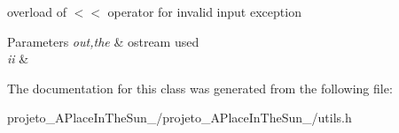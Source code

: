 overload of $<$$<$ operator for invalid input exception 


\begin{DoxyParams}{Parameters}
{\em out,the} & ostream used\\
\hline
{\em ii} & \\
\hline
\end{DoxyParams}


The documentation for this class was generated from the following file\+:\begin{DoxyCompactItemize}
\item 
projeto\+\_\+\+A\+Place\+In\+The\+Sun\+\_/projeto\+\_\+\+A\+Place\+In\+The\+Sun\+\_/utils.\+h\end{DoxyCompactItemize}
